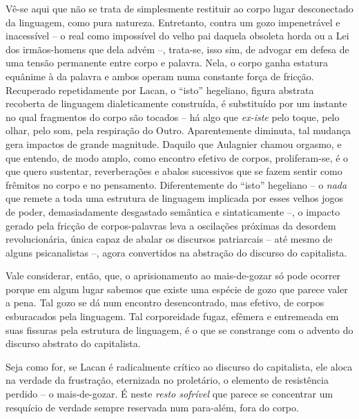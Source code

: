 Vê-se aqui que não se trata de simplesmente restituir ao corpo lugar
desconectado da linguagem, como pura natureza. Entretanto, contra um
gozo impenetrável e inacessível -- o real como impossível do velho pai
daquela obsoleta horda ou a Lei dos irmãos-homens que dela advém --,
trata-se, isso sim, de advogar em defesa de uma tensão permanente entre
corpo e palavra. Nela, o corpo ganha estatura equânime à da palavra e
ambos operam numa constante força de fricção. Recuperado repetidamente
por Lacan, o ``isto'' hegeliano, figura abstrata recoberta de linguagem
dialeticamente construída, é substituído por um instante no qual
fragmentos do corpo são tocados -- há algo que \emph{ex-iste} pelo
toque, pelo olhar, pelo som, pela respiração do Outro. Aparentemente
diminuta, tal mudança gera impactos de grande magnitude. Daquilo que
Aulagnier chamou orgasmo, e que entendo, de modo amplo, como encontro
efetivo de corpos, proliferam-se, é o que quero sustentar, reverberações
e abalos sucessivos que se fazem sentir como frêmitos no corpo e no
pensamento. Diferentemente do ``isto'' hegeliano -- o \emph{nada} que
remete a toda uma estrutura de linguagem implicada por esses velhos
jogos de poder, demasiadamente desgastado semântica e sintaticamente --,
o impacto gerado pela fricção de corpos-palavras leva a oscilações
próximas da desordem revolucionária, única capaz de abalar os discursos
patriarcais -- até mesmo de alguns psicanalistas --, agora convertidos
na abstração do discurso do capitalista.

\asterisc

Vale considerar, então, que, o aprisionamento ao mais-de-gozar só pode
ocorrer porque em algum lugar sabemos que existe uma espécie de gozo que
parece valer a pena. Tal gozo se dá num encontro desencontrado, mas
efetivo, de corpos esburacados pela linguagem. Tal corporeidade fugaz,
efêmera e entremeada em suas fissuras pela estrutura de linguagem, é o
que se constrange com o advento do discurso abstrato do capitalista.

Seja como for, se Lacan é radicalmente crítico ao discurso do
capitalista, ele aloca na verdade da frustração, eternizada no
proletário, o elemento de resistência perdido -- o mais-de-gozar. É
neste \emph{resto sofrível} que parece se concentrar um resquício de
verdade sempre reservada num para-além, fora do corpo.

